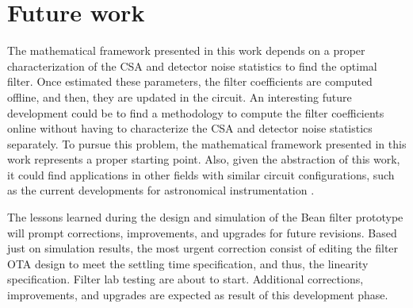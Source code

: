 \section{Future work}

The mathematical framework presented in this work depends on a proper characterization of the CSA and detector noise statistics to find the optimal filter. Once estimated these parameters, the filter coefficients are computed offline, and then, they are updated in the circuit. An interesting future development could be to find a methodology to compute the filter coefficients online without having to characterize the CSA and detector noise statistics separately. To pursue this problem, the mathematical framework presented in this work represents a proper starting point. Also, given the abstraction of this work, it could find applications in other fields with similar circuit configurations, such as the current developments for astronomical instrumentation \citep{guzman101}.

The lessons learned during the design and simulation of the Bean filter prototype will prompt corrections, improvements, and upgrades for future revisions. Based just on simulation results, the most urgent correction consist of editing the filter OTA design to meet the settling time specification, and thus, the linearity specification.  Filter lab testing are about to start. Additional corrections, improvements, and upgrades are expected as result of this development phase.
